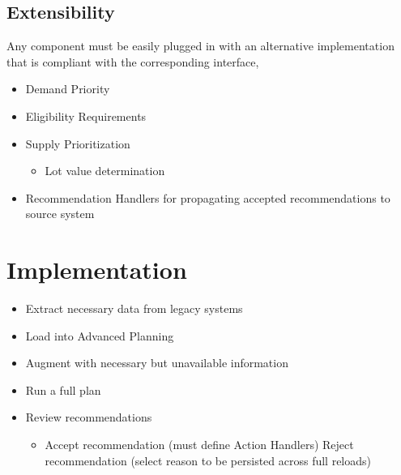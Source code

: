 \documentclass[letterpaper,10pt,english]{sphinxmanual}
\begin{document}
\section{Extensibility}
\label{\detokenize{BusinessProcessReengineering:id13}}
Any component must be easily plugged in with an alternative
implementation that is compliant with the corresponding interface,
\begin{itemize}
\item {} 
Demand Priority

\item {} 
Eligibility Requirements

\item {} 
Supply Prioritization
\begin{itemize}
\item {} 
Lot value determination

\end{itemize}

\item {} 
Recommendation Handlers for propagating accepted recommendations to
source system

\end{itemize}


\chapter{Implementation}
\label{\detokenize{BusinessProcessReengineering:id14}}\begin{itemize}
\item {} 
Extract necessary data from legacy systems

\item {} 
Load into Advanced Planning

\item {} 
Augment with necessary but unavailable information

\item {} 
Run a full plan

\item {} 
Review recommendations
\begin{itemize}
\item {} 
Accept recommendation (must define Action Handlers) Reject
recommendation (select reason to be persisted across full reloads)

\end{itemize}

\end{itemize}
\end{document}
